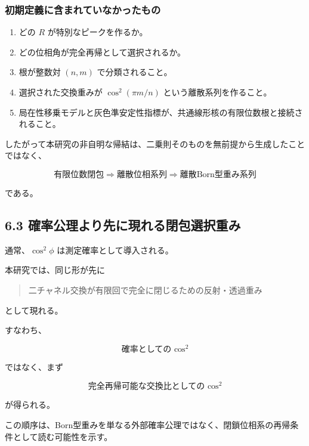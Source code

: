 \documentclass[
  a4paper,
  10pt]{article}
\providecommand{\tightlist}{%
  \setlength{\itemsep}{0pt}\setlength{\parskip}{0pt}}
\begin{document}
\subsubsection{初期定義に含まれていなかったもの}\label{ux521dux671fux5b9aux7fa9ux306bux542bux307eux308cux3066ux3044ux306aux304bux3063ux305fux3082ux306e}

\begin{enumerate}
\def\labelenumi{\arabic{enumi}.}
\tightlist
\item
  どの \(R\) が特別なピークを作るか。
\item
  どの位相角が完全再帰として選択されるか。
\item
  根が整数対 \((n,m)\) で分類されること。
\item
  選択された交換重みが \(\cos^2(\pi m/n)\) という離散系列を作ること。
\item
  局在性移乗モデルと灰色準安定性指標が、共通線形核の有限位数根と接続されること。
\end{enumerate}

したがって本研究の非自明な帰結は、二乗則そのものを無前提から生成したことではなく、

\[
\boxed{
\text{有限位数閉包}
\Rightarrow
\text{離散位相系列}
\Rightarrow
\text{離散Born型重み系列}
}
\]

である。

\subsection{6.3
確率公理より先に現れる閉包選択重み}\label{63-ux78baux7387ux516cux7406ux3088ux308aux5148ux306bux73feux308cux308bux9589ux5305ux9078ux629eux91cdux307f}

通常、\(\cos^2\phi\) は測定確率として導入される。

本研究では、同じ形が先に

\begin{quote}
二チャネル交換が有限回で完全に閉じるための反射・透過重み
\end{quote}

として現れる。

すなわち、

\[
\text{確率としての }\cos^2
\]

ではなく、まず

\[
\text{完全再帰可能な交換比としての }\cos^2
\]

が得られる。

この順序は、Born型重みを単なる外部確率公理ではなく、閉鎖位相系の再帰条件として読む可能性を示す。
\end{document}

